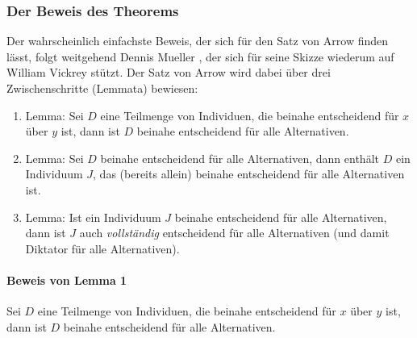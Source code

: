 \begin{enumerate}
%     
% 
% 
% 
\end{enumerate}

\subsubsection{Der Beweis des Theorems}
\label{BeweisArrow}
Der wahrscheinlich einfachste Beweis, der sich für den Satz von Arrow finden
lässt, folgt weitgehend Dennis Mueller \cite[S. 583f.]{mueller:2003}, der
sich für seine Skizze wiederum auf William Vickrey stützt. Der Satz von Arrow wird
dabei über drei Zwischenschritte (Lemmata) bewiesen:
\begin{enumerate}
  \item Lemma: Sei $D$ eine Teilmenge von Individuen, die
  beinahe entscheidend für $x$ über $y$ ist, dann ist $D$
  beinahe entscheidend für alle Alternativen.
  
  \item Lemma: Sei $D$ beinahe entscheidend für alle
  Alternativen, dann enthält $D$ ein Individuum $J$, das
  (bereits allein) beinahe entscheidend für alle Alternativen ist.
 
  \item Lemma: Ist ein Individuum $J$ beinahe entscheidend für
  alle Alternativen, dann ist $J$ auch {\em vollständig} entscheidend
  für alle Alternativen (und damit Diktator für alle Alternativen).
\end{enumerate}


\paragraph{Beweis von Lemma 1} Sei $D$ eine Teilmenge von Individuen, die
  beinahe entscheidend für $x$ über $y$ ist, dann ist $D$
  beinahe entscheidend für alle Alternativen. 

